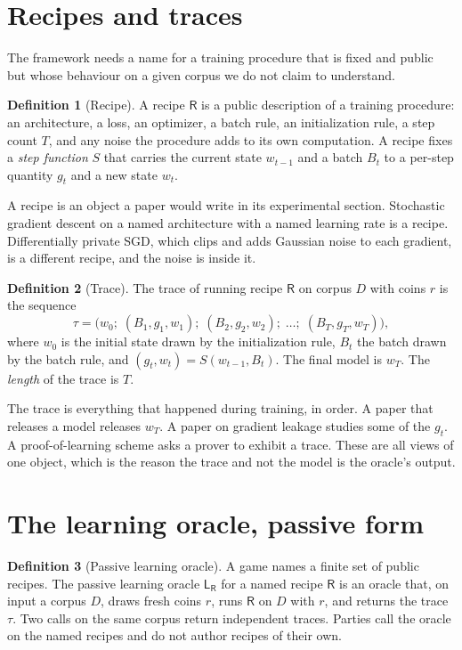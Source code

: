 \documentclass[11pt]{article}
\theoremstyle{definition}
\newtheorem{definition}{Definition}
\theoremstyle{plain}
\theoremstyle{remark}
\newcommand{\Lo}{\mathsf{L}}
\newcommand{\Rec}{\mathsf{R}}
\newcommand{\Tr}{\tau}
\begin{document}
\section{Recipes and traces}
\label{sec:recipe}

The framework needs a name for a training procedure that is fixed and public but
whose behaviour on a given corpus we do not claim to understand.

\begin{definition}[Recipe]
\label{def:recipe}
A recipe $\Rec$ is a public description of a training procedure: an architecture,
a loss, an optimizer, a batch rule, an initialization rule, a step count $T$, and
any noise the procedure adds to its own computation. A recipe fixes a
\emph{step function} $S$ that carries the current state $w_{t-1}$ and a batch
$B_t$ to a per-step quantity $g_t$ and a new state $w_t$.
\end{definition}

A recipe is an object a paper would write in its experimental section. Stochastic
gradient descent on a named architecture with a named learning rate is a recipe.
Differentially private SGD, which clips and adds Gaussian noise to each gradient,
is a different recipe, and the noise is inside it.

\begin{definition}[Trace]
\label{def:trace}
The trace of running recipe $\Rec$ on corpus $D$ with coins $r$ is the sequence
\[
\Tr = \big(w_0;\; (B_1, g_1, w_1);\; (B_2, g_2, w_2);\; \dots;\; (B_T, g_T, w_T)\big),
\]
where $w_0$ is the initial state drawn by the initialization rule, $B_t$ the batch
drawn by the batch rule, and $(g_t, w_t) = S(w_{t-1}, B_t)$. The final model is
$w_T$. The \emph{length} of the trace is $T$.
\end{definition}

The trace is everything that happened during training, in order. A paper that
releases a model releases $w_T$. A paper on gradient leakage studies some of the
$g_t$. A proof-of-learning scheme asks a prover to exhibit a trace. These are all
views of one object, which is the reason the trace and not the model is the
oracle's output.

\section{The learning oracle, passive form}
\label{sec:passive}

\begin{definition}[Passive learning oracle]
\label{def:passive}
A game names a finite set of public recipes. The passive learning oracle
$\Lo_{\Rec}$ for a named recipe $\Rec$ is an oracle that, on input a corpus $D$,
draws fresh coins $r$, runs $\Rec$ on $D$ with $r$, and returns the trace $\Tr$.
Two calls on the same corpus return independent traces. Parties call the oracle
on the named recipes and do not author recipes of their own.
\end{definition}
\end{document}

